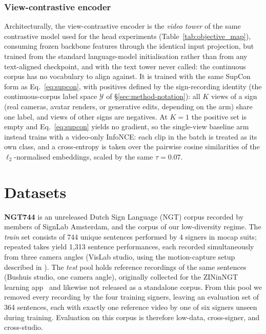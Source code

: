 \subsubsection{View-contrastive encoder}
Architecturally, the view-contrastive encoder is the \emph{video tower}
of the same contrastive model used for the head experiments
(Table~\ref{tab:objective_map}), consuming frozen backbone features
through the identical input projection, but trained from the standard
language-model initialisation rather than from any text-aligned
checkpoint, and with the text tower never called: the continuous corpus
has no vocabulary to align against. It is trained
with the same SupCon form as
Eq.~\eqref{eq:supcon}, with positives defined by the sign-recording
identity (the continuous-corpus label space $\mathcal{Y}$ of
\S\ref{sec:method-notation}): all $K$ views of a sign (real cameras, avatar renders, or
generative edits, depending on the arm) share one label, and views of
other signs are negatives.
At $K{=}1$ the positive set is empty and
Eq.~\eqref{eq:supcon} yields no gradient, so the single-view baseline arm
instead trains with a video-only InfoNCE: each clip in the batch is treated
as its own class, and a cross-entropy is taken over the pairwise cosine
similarities of the $\ell_2$-normalised embeddings, scaled by the same
$\tau = 0.07$.

\section{Datasets}
\label{sec:setup-datasets}
\textbf{NGT744} is an unreleased Dutch Sign Language (NGT) corpus
recorded by members of SignLab Amsterdam, and the corpus of our
low-diversity regime. The \emph{train} set consists of 744 unique
sentences performed by 4 signers in mocap suits; repeated takes yield
1{,}313 sentence performances, each recorded simultaneously from three
camera angles (VisLab studio, using the motion-capture setup described
in \citet{NGT_motion_capture}). The
\emph{test} pool holds reference recordings of the same sentences (Bushuis studio, one camera angle), originally collected
for the ZINinNGT learning app~\cite{ritmeester2024zininngt} and likewise
not released as a standalone corpus. From this pool we removed every
recording by the four training signers, leaving an evaluation set of 364
sentences, each with exactly one reference video by one of six signers
unseen during training. Evaluation on this corpus is therefore low-data,
cross-signer, and cross-studio.

